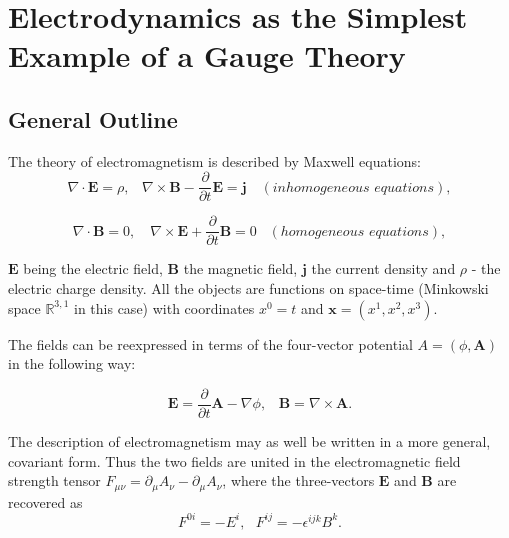 \documentclass[11pt]{report}
\theoremstyle{plain}
\theoremstyle{definition}
\theoremstyle{remark}
\theoremstyle{remark}
\numberwithin{equation}{section}
\begin{document}
\section{Electrodynamics as the Simplest Example of a Gauge Theory}
\subsection{General Outline}

The theory of electromagnetism is described by Maxwell equations:
%
\begin{equation}\label{Max1}
\nabla \cdotp \mathbf{E} = \rho , \, \, \, \, \,   \nabla \times \mathbf{B} - \frac{\partial}{\partial t} \mathbf{E} = \mathbf{j} \,\, \, \, \, \, (inhomogeneous \, \, equations),
\end{equation}


\begin{equation}\label{Max2}
\nabla \cdotp \mathbf{B} = 0, \, \, \, \, \, \,  \nabla \times \mathbf{E} + \frac{\partial}{\partial t} \mathbf{B} = 0 \,\, \, \, \, (homogeneous\, \, equations),
\end{equation}
%


$\mathbf{E}$ being the electric field, $\mathbf{B}$ the magnetic field,  $\mathbf{j}$ the current density and $\rho$ - the electric charge density. All the objects are functions on space-time (Minkowski space $\mathbb{R}^{3,1}$ in this case) with coordinates $x^0 = t$ and $\mathbf{x} = (x^1,x^2,x^3)$.

The fields can be reexpressed in terms of the four-vector potential $A = (\phi, \mathbf{A})$ in the following way:

% 
\begin{equation}
\mathbf{E} = \frac{\partial}{\partial t}\mathbf{A} - \nabla \phi, \, \, \, \, \,   
\mathbf{B} = \nabla \times \mathbf{A}.
\end{equation}
%

The description of electromagnetism may as well be written in a more general, covariant form. Thus the two fields are united in the electromagnetic field strength tensor $F_{\mu\nu} = \partial_{\mu}A_{\nu} - \partial_{\mu}A_{\nu}$, where the three-vectors $\mathbf{E}$ and $\mathbf{B}$ are recovered as 
%
\begin{equation}
F^{0i} = - E^i, \,\,\,\,     F^{ij} = - \epsilon^{ijk}B^k.
\end{equation}
%
\end{document}
